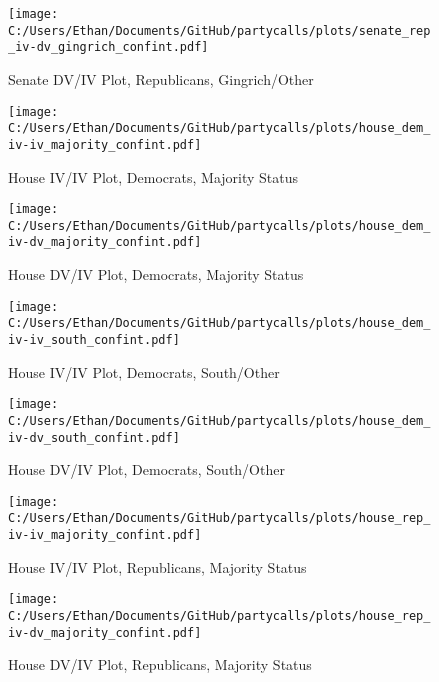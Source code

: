 \documentclass[12pt]{article}
\begin{document}
\begin{figure}[H]
	\centering
	\caption{Senate DV/IV Plot, Republicans, Gingrich/Other}
	\texttt{[image: C:/Users/Ethan/Documents/GitHub/partycalls/plots/senate\_rep\_iv-dv\_gingrich\_confint.pdf]}
\end{figure}

\begin{figure}[H]
	\centering
	\caption{House IV/IV Plot, Democrats, Majority Status}
	\texttt{[image: C:/Users/Ethan/Documents/GitHub/partycalls/plots/house\_dem\_iv-iv\_majority\_confint.pdf]}
\end{figure}

\begin{figure}[H]
	\centering
	\caption{House DV/IV Plot, Democrats, Majority Status}
	\texttt{[image: C:/Users/Ethan/Documents/GitHub/partycalls/plots/house\_dem\_iv-dv\_majority\_confint.pdf]}
\end{figure}

\begin{figure}[H]
	\centering
	\caption{House IV/IV Plot, Democrats, South/Other}
	\texttt{[image: C:/Users/Ethan/Documents/GitHub/partycalls/plots/house\_dem\_iv-iv\_south\_confint.pdf]}
\end{figure}

\begin{figure}[H]
	\centering
	\caption{House DV/IV Plot, Democrats, South/Other}
	\texttt{[image: C:/Users/Ethan/Documents/GitHub/partycalls/plots/house\_dem\_iv-dv\_south\_confint.pdf]}
\end{figure}

\begin{figure}[H]
	\centering
	\caption{House IV/IV Plot, Republicans, Majority Status}
	\texttt{[image: C:/Users/Ethan/Documents/GitHub/partycalls/plots/house\_rep\_iv-iv\_majority\_confint.pdf]}
\end{figure}

\begin{figure}[H]
	\centering
	\caption{House DV/IV Plot, Republicans, Majority Status}
	\texttt{[image: C:/Users/Ethan/Documents/GitHub/partycalls/plots/house\_rep\_iv-dv\_majority\_confint.pdf]}
\end{figure}
\end{document}
